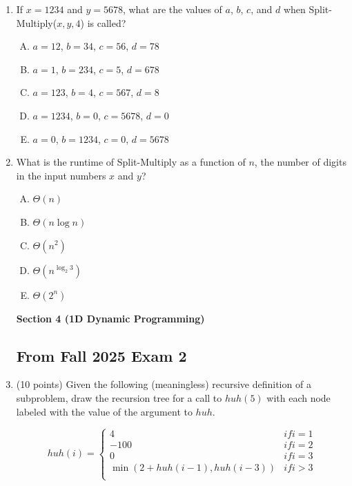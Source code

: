 \documentclass[11pt]{article}
\begin{document}
\begin{enumerate}
\item If $x=1234$ and $y=5678$, what are the values of $a$, $b$, $c$, and $d$ when
Split-Multiply($x,y,4$) is called?
\begin{enumerate}[A.]
    \item $a=12$, $b=34$, $c=56$, $d=78$
    \item $a=1$, $b=234$, $c=5$, $d=678$
    \item $a=123$, $b=4$, $c=567$, $d=8$
    \item $a=1234$, $b=0$, $c=5678$, $d=0$
    \item $a=0$, $b=1234$, $c=0$, $d=5678$  
\end{enumerate}

\item What is the runtime of Split-Multiply as a function of $n$, the number of digits
in the input numbers $x$ and $y$?
\begin{enumerate}[A.]
    \item $\Theta(n)$
    \item $\Theta(n \log n)$
    \item $\Theta(n^2)$
    \item $\Theta(n^{\log_2 3})$
    \item $\Theta(2^n)$
\end{enumerate}
\newpage

\begin{center}
\LARGE\textbf{Section 4 (1D Dynamic Programming)\\}%
\end{center}

\subsection*{From Fall 2025 Exam 2}
\item (10 points) Given the following (meaningless) recursive definition of a subproblem, draw the 
recursion tree for a call to $huh(5)$ with each node labeled with the value of the argument to $huh$.

\begin{equation*}
    huh(i) =
    \begin{cases}
        4 & if i = 1 \\
        -100 & if i = 2\\
        0 & if i = 3\\
        \min \left(2 + huh(i-1), huh(i-3)\right) & if i > 3 \\


\end{cases}
\end{equation*}
\end{enumerate}
\end{document}
